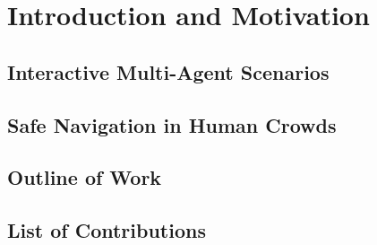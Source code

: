 \chapter{Introduction and Motivation}
\label{text:introduction}

\section{Interactive Multi-Agent Scenarios}
\label{text:introduction/interactive_multi_agent_scenarios}

\section{Safe Navigation in Human Crowds}
\label{text:introduction/safe_navigation_human_crowds}

\section{Outline of Work}
\label{text:introduction/outline}

\section{List of Contributions}
\label{text:introduction/contributions}

